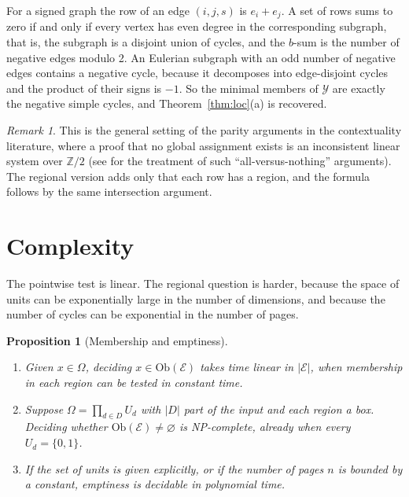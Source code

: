 \documentclass[11pt]{article}
\theoremstyle{plain}
\newtheorem{proposition}[theorem]{Proposition}
\theoremstyle{definition}
\theoremstyle{remark}
\newtheorem{remark}[theorem]{Remark}
\newcommand{\Om}{\Omega}
\newcommand{\Ob}{\mathrm{Ob}}
\begin{document}
For a signed graph the row of an edge $(i,j,s)$ is $e_i+e_j$. A set of rows sums to zero if and only if every vertex has even degree in the corresponding subgraph, that is, the subgraph is a disjoint union of cycles, and the $b$-sum is the number of negative edges modulo 2. An Eulerian subgraph with an odd number of negative edges contains a negative cycle, because it decomposes into edge-disjoint cycles and the product of their signs is $-1$. So the minimal members of $\mathcal Y$ are exactly the negative simple cycles, and Theorem~\ref{thm:loc}(a) is recovered.

\begin{remark}
This is the general setting of the parity arguments in the contextuality literature, where a proof that no global assignment exists is an inconsistent linear system over $\mathbb Z/2$ (see \cite{abramsky2015} for the treatment of such ``all-versus-nothing'' arguments). The regional version adds only that each row has a region, and the formula follows by the same intersection argument.
\end{remark}

\section{Complexity}\label{sec:cx}

The pointwise test is linear. The regional question is harder, because the space of units can be exponentially large in the number of dimensions, and because the number of cycles can be exponential in the number of pages.

\begin{proposition}[Membership and emptiness]\label{prop:cx}
\begin{enumerate}[label=(\alph*)]
\item Given $x\in\Om$, deciding $x\in\Ob(\mathcal E)$ takes time linear in $|\mathcal E|$, when membership in each region can be tested in constant time.
\item Suppose $\Om=\prod_{d\in D}U_d$ with $|D|$ part of the input and each region a box. Deciding whether $\Ob(\mathcal E)\ne\varnothing$ is NP-complete, already when every $U_d=\{0,1\}$.
\item If the set of units is given explicitly, or if the number of pages $n$ is bounded by a constant, emptiness is decidable in polynomial time.
\end{enumerate}
\end{proposition}
\end{document}
